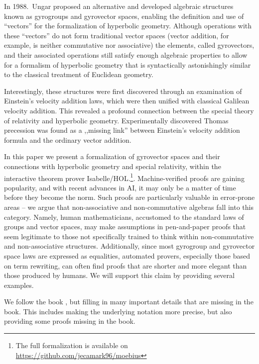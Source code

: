 \documentclass[a4paper]{article}
\theoremstyle{definition}
\begin{document}
In 1988.~Ungar \cite{ungar-analytic} proposed an alternative and
developed algebraic structures known as gyrogroups and gyrovector
spaces, enabling the definition and use of ``vectors'' for the
formalization of hyperbolic geometry. Although operations with these
``vectors'' do not form traditional vector spaces (vector addition,
for example, is neither commutative nor associative) the elements,
called gyrovectors, and their associated operations still satisfy
enough algebraic properties to allow for a formalism of hyperbolic
geometry that is syntactically astonishingly similar to the classical
treatment of Euclidean geometry.

Interestingly, these structures were first discovered through an
examination of Einstein's velocity addition laws, which were then
unified with classical Galilean velocity addition. This revealed a
profound connection between the special theory of relativity and
hyperbolic geometry. Experimentally discovered Thomas
precession\cite{ungar-analytic} was found as a ,,missing link''
between Einstein's velocity addition formula and the ordinary vector
addition.

In this paper we present a formalization of gyrovector spaces and
their connections with hyperbolic geometry and special relativity,
within the interactive theorem prover Isabelle/HOL.\footnote{The full
  formalization is available on
  \url{https://github.com/jecamark96/moebius}}. Machine-verified
proofs are gaining popularity, and with recent advances in AI, it may
only be a matter of time before they become the norm. Such proofs are
particularly valuable in error-prone areas -- we argue that
non-associative and non-commutative algebras fall into this
category. Namely, human mathematicians, accustomed to the standard
laws of groups and vector spaces, may make assumptions in
pen-and-paper proofs that seem legitimate to those not specifically
trained to think within non-commutative and non-associative
structures. Additionally, since most gyrogroup and gyrovector space
laws are expressed as equalities, automated provers, especially those
based on term rewriting, can often find proofs that are shorter and
more elegant than those produced by humans. We will support this claim
by providing several examples.

We follow the book \cite{ungar-analytic}, but filling in many
important details that are missing in the book. This includes making
the underlying notation more precise, but also providing some proofs
missing in the book.
\end{document}
